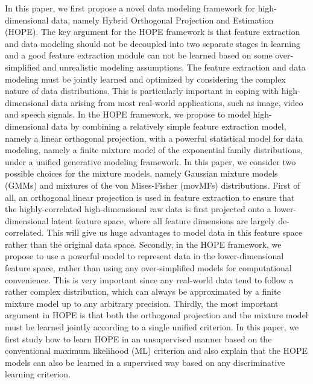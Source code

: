 \documentclass[11pt]{article}
\begin{document}
In this paper, we first propose a novel data modeling framework for high-dimensional data, namely Hybrid Orthogonal Projection and Estimation (HOPE). The key argument for the HOPE framework is that feature extraction and data modeling should not be decoupled into two separate stages in learning and a good feature extraction module can not be learned based on some over-simplified and  unrealistic modeling assumptions. The feature extraction and data modeling must be jointly learned and optimized by considering the complex nature of data distributions. This is particularly important in coping with high-dimensional data arising from most real-world applications, such as image, video and speech signals. In the HOPE framework, we propose to model high-dimensional data by combining a relatively simple feature extraction model, namely a linear orthogonal projection, with a powerful statistical model for data modeling, namely a finite mixture model of the exponential family distributions, under a unified generative modeling framework. In this paper, we consider two possible choices for the mixture models, namely Gaussian mixture models (GMMs) and mixtures of the von Mises-Fisher (movMFs) distributions. First of all, an orthogonal linear projection is used in feature extraction to ensure that the highly-correlated high-dimensional raw data is first projected onto a lower-dimensional latent feature space, where all feature dimensions are largely de-correlated. This will give us huge advantages to model data in this feature space rather than the original data space. 
Secondly, in the HOPE framework, we propose to use a powerful model to represent data in the lower-dimensional feature space, rather than using any over-simplified models for computational convenience. This is very important since any real-world data tend to follow a rather complex distribution, which can always be approximated by a finite mixture model up to any arbitrary precision. Thirdly, the most important argument in HOPE is that both the orthogonal projection and the mixture model must be learned jointly according to a single unified criterion. In this paper, we first study how to learn HOPE in an unsupervised manner based on the conventional maximum likelihood (ML) criterion and also explain that the HOPE models can also be learned in a supervised way based on any discriminative learning criterion.
\end{document}
